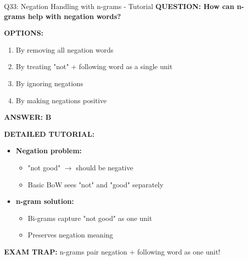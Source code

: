 \documentclass[8pt]{beamer}
\begin{document}
	\begin{frame}{Q33: Negation Handling with n-grams - Tutorial}
		\fontsize{6.5}{7.5}\selectfont
		\textbf{QUESTION: How can n-grams help with negation words?}
		
		\vspace{0.1cm}
		\textbf{OPTIONS:}
		\begin{enumerate}
			\item By removing all negation words
			\item By treating "not" + following word as a single unit
			\item By ignoring negations
			\item By making negations positive
		\end{enumerate}
		
		\vspace{0.1cm}
		\textcolor{myblue}{\textbf{ANSWER: B}}
		
		\vspace{0.1cm}
		\textbf{DETAILED TUTORIAL:}
		\begin{itemize}
			\item \textbf{Negation problem:}
			\begin{itemize}
				\item "not good" $\to$ should be negative
				\item Basic BoW sees "not" and "good" separately
			\end{itemize}
			\item \textbf{n-gram solution:}
			\begin{itemize}
				\item Bi-grams capture "not good" as one unit
				\item Preserves negation meaning
			\end{itemize}
		\end{itemize}
		
		\textcolor{myred}{\textbf{EXAM TRAP:}} n-grams pair \textcolor{myblue}{negation + following word} as one unit!
	\end{frame}
	
\end{document}
